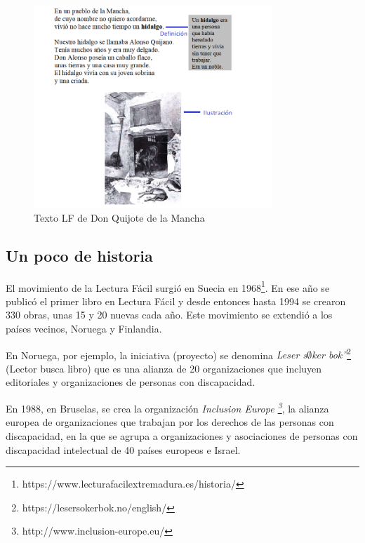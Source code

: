 \begin{figure}[htb]
	\centering
	\includegraphics[width=0.8\textwidth]{Imagenes/Ejemplos/Cap1DonQuijoteLF}
	\caption{Texto LF de Don Quijote de la Mancha}
	\label{fig:QuijoteLF}
\end{figure}




\subsection{Un poco de historia}
El movimiento de la Lectura Fácil surgió en Suecia en 1968\footnote{https://www.lecturafacilextremadura.es/historia/}. En ese año se publicó el primer libro en Lectura Fácil y desde entonces hasta 1994 se crearon 330 obras, unas 15 y 20 nuevas cada año. Este movimiento se extendió a los países vecinos, Noruega y Finlandia.

 \setlength{\parskip}{10pt}
 
En Noruega, por ejemplo, la iniciativa (proyecto) se denomina \textit{Leser s$\emptyset$ker bok”}\footnote{https://lesersokerbok.no/english/} (Lector busca libro) que es una alianza de 20 organizaciones que incluyen editoriales y organizaciones de personas con discapacidad.

 \setlength{\parskip}{10pt}
 
En 1988, en Bruselas, se crea la organización \textit{Inclusion Europe \footnote{http://www.inclusion-europe.eu/}}, la alianza europea de organizaciones que trabajan por los derechos de las personas con discapacidad, en la que se agrupa a organizaciones y asociaciones de personas con discapacidad intelectual de 40 países europeos e Israel.

